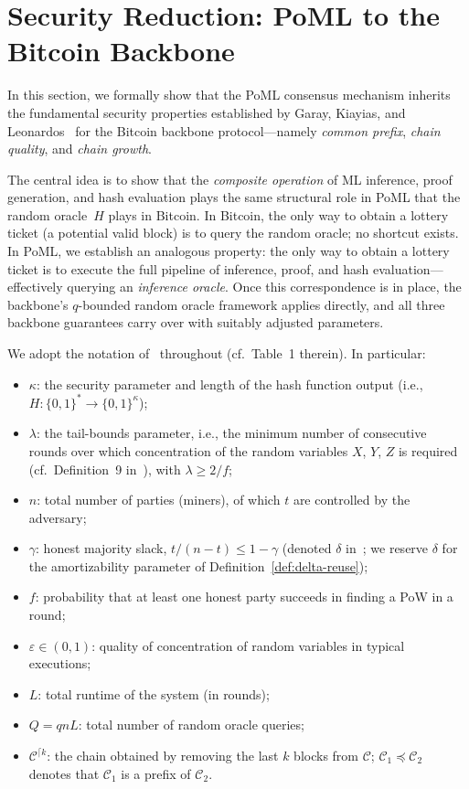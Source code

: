 \section{Security Reduction: PoML to the Bitcoin Backbone} 
\label{sec:reduction}

In this section, we formally show that the PoML consensus mechanism inherits the fundamental security properties established by Garay, Kiayias, and Leonardos~\cite{GKL20} for the Bitcoin backbone protocol---namely \emph{common prefix}, \emph{chain quality}, and \emph{chain growth}.

The central idea is to show that the \emph{composite operation} of ML inference, proof generation, and hash evaluation plays the same structural role in PoML that the random oracle~$H$ plays in Bitcoin. In Bitcoin, the only way to obtain a lottery ticket (a potential valid block) is to query the random oracle; no shortcut exists. In PoML, we establish an analogous property: the only way to obtain a lottery ticket is to execute the full pipeline of inference, proof, and hash evaluation---effectively querying an \emph{inference oracle}. Once this correspondence is in place, the backbone's $q$-bounded random oracle framework applies directly, and all three backbone guarantees carry over with suitably adjusted parameters.

We adopt the notation of~\cite{GKL20} throughout (cf.\ Table~1 therein). In particular:
\begin{itemize}
    \item $\kappa$: the security parameter and length of the hash function output (i.e., $H : \{0,1\}^* \to \{0,1\}^\kappa$);
    \item $\lambda$: the tail-bounds parameter, i.e., the minimum number of consecutive rounds over which concentration of the random variables $X$, $Y$, $Z$ is required (cf.\ Definition~9 in~\cite{GKL20}), with $\lambda \geq 2/f$;
    \item $n$: total number of parties (miners), of which $t$ are controlled by the adversary;
    \item $\gamma$: honest majority slack, $t/(n-t) \leq 1 - \gamma$ (denoted $\delta$ in~\cite{GKL20}; we reserve $\delta$ for the amortizability parameter of Definition~\ref{def:delta-reuse});
    \item $f$: probability that at least one honest party succeeds in finding a PoW in a round;
    \item $\varepsilon \in (0,1)$: quality of concentration of random variables in typical executions;
    \item $L$: total runtime of the system (in rounds);
    \item $Q = qnL$: total number of random oracle queries;
    \item $\mathcal{C}^{\lceil k}$: the chain obtained by removing the last $k$ blocks from $\mathcal{C}$; $\mathcal{C}_1 \preceq \mathcal{C}_2$ denotes that $\mathcal{C}_1$ is a prefix of $\mathcal{C}_2$.
\end{itemize}


